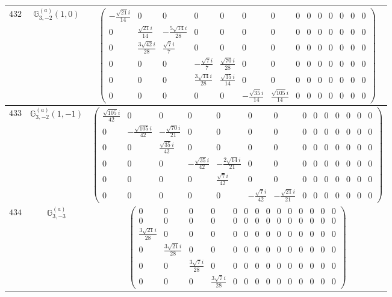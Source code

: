 \documentclass[fleqn,8pt,landscape]{jsarticle}
\begin{document}
\begin{center}
\begin{longtable}{ccc}
$ 432 $ & $ \mathbb{G}_{3,-2}^{(a)}(1,0) $ & $ \begin{pmatrix} - \frac{\sqrt{21} i}{14} & 0 & 0 & 0 & 0 & 0 & 0 & 0 & 0 & 0 & 0 & 0 & 0 & 0 \\ 0 & \frac{\sqrt{21} i}{14} & - \frac{5 \sqrt{14} i}{28} & 0 & 0 & 0 & 0 & 0 & 0 & 0 & 0 & 0 & 0 & 0 \\ 0 & \frac{3 \sqrt{42} i}{28} & \frac{\sqrt{7} i}{7} & 0 & 0 & 0 & 0 & 0 & 0 & 0 & 0 & 0 & 0 & 0 \\ 0 & 0 & 0 & - \frac{\sqrt{7} i}{7} & \frac{\sqrt{70} i}{28} & 0 & 0 & 0 & 0 & 0 & 0 & 0 & 0 & 0 \\ 0 & 0 & 0 & \frac{3 \sqrt{14} i}{28} & \frac{\sqrt{35} i}{14} & 0 & 0 & 0 & 0 & 0 & 0 & 0 & 0 & 0 \\ 0 & 0 & 0 & 0 & 0 & - \frac{\sqrt{35} i}{14} & \frac{\sqrt{105} i}{14} & 0 & 0 & 0 & 0 & 0 & 0 & 0 \end{pmatrix} $ \\ \hline
$ 433 $ & $ \mathbb{G}_{3,-2}^{(a)}(1,-1) $ & $ \begin{pmatrix} \frac{\sqrt{105} i}{42} & 0 & 0 & 0 & 0 & 0 & 0 & 0 & 0 & 0 & 0 & 0 & 0 & 0 \\ 0 & - \frac{\sqrt{105} i}{42} & - \frac{\sqrt{70} i}{21} & 0 & 0 & 0 & 0 & 0 & 0 & 0 & 0 & 0 & 0 & 0 \\ 0 & 0 & \frac{\sqrt{35} i}{42} & 0 & 0 & 0 & 0 & 0 & 0 & 0 & 0 & 0 & 0 & 0 \\ 0 & 0 & 0 & - \frac{\sqrt{35} i}{42} & - \frac{2 \sqrt{14} i}{21} & 0 & 0 & 0 & 0 & 0 & 0 & 0 & 0 & 0 \\ 0 & 0 & 0 & 0 & \frac{\sqrt{7} i}{42} & 0 & 0 & 0 & 0 & 0 & 0 & 0 & 0 & 0 \\ 0 & 0 & 0 & 0 & 0 & - \frac{\sqrt{7} i}{42} & - \frac{\sqrt{21} i}{21} & 0 & 0 & 0 & 0 & 0 & 0 & 0 \end{pmatrix} $ \\ \hline
$ 434 $ & $ \mathbb{G}_{3,-3}^{(a)} $ & $ \begin{pmatrix} 0 & 0 & 0 & 0 & 0 & 0 & 0 & 0 & 0 & 0 & 0 & 0 & 0 & 0 \\ 0 & 0 & 0 & 0 & 0 & 0 & 0 & 0 & 0 & 0 & 0 & 0 & 0 & 0 \\ \frac{3 \sqrt{21} i}{28} & 0 & 0 & 0 & 0 & 0 & 0 & 0 & 0 & 0 & 0 & 0 & 0 & 0 \\ 0 & \frac{3 \sqrt{21} i}{28} & 0 & 0 & 0 & 0 & 0 & 0 & 0 & 0 & 0 & 0 & 0 & 0 \\ 0 & 0 & \frac{3 \sqrt{7} i}{28} & 0 & 0 & 0 & 0 & 0 & 0 & 0 & 0 & 0 & 0 & 0 \\ 0 & 0 & 0 & \frac{3 \sqrt{7} i}{28} & 0 & 0 & 0 & 0 & 0 & 0 & 0 & 0 & 0 & 0 \end{pmatrix} $ \\ \hline

\end{longtable}
\end{center}
\end{document}
